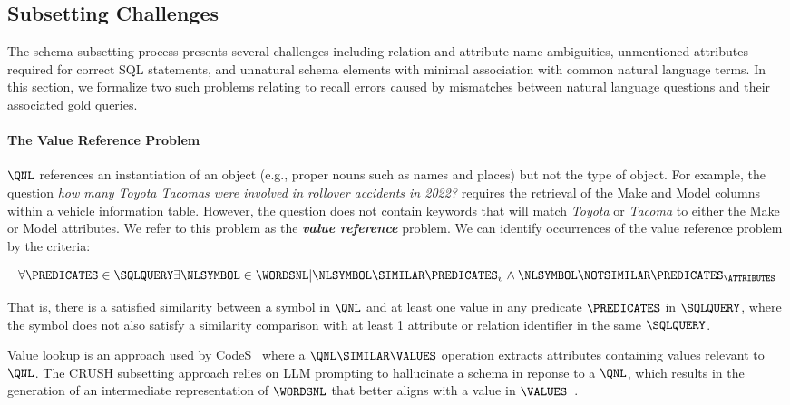 \subsection{Subsetting Challenges}
\label{sec:subsetting-challenges}

The schema subsetting process presents several challenges including relation and attribute name ambiguities, unmentioned attributes required for correct SQL statements, and unnatural schema elements with minimal association with common natural language terms.
In this section, we formalize two such problems relating to recall errors caused by mismatches between natural language questions and their associated gold queries.

\paragraph{\textbf{The Value Reference Problem}}
$\QNL$ references an instantiation of an object (e.g., proper nouns such as names and places) but not the type of object.
For example, the question \emph{how many Toyota Tacomas were involved in rollover accidents in 2022?} requires the retrieval of the Make and Model columns within a vehicle information table.
However, the question does not contain keywords that will match \emph{Toyota} or \emph{Tacoma} to either the Make or Model attributes.
We refer to this problem as the \textbf{\emph{value reference}} problem.
We can identify occurrences of the value reference problem by the criteria:

\begin{equation}
  \forall \PREDICATES \in \SQLQUERY \exists \NLSYMBOL \in \WORDSNL | \NLSYMBOL \SIMILAR \PREDICATES_v \land \NLSYMBOL \NOTSIMILAR \PREDICATES_\ATTRIBUTES
\end{equation}

That is, there is a satisfied similarity between a symbol in $\QNL$ and at least one value in any predicate $\PREDICATES$ in $\SQLQUERY$, where the symbol does not also satisfy a similarity comparison with at least 1 attribute or relation identifier in the same $\SQLQUERY$.

Value lookup is an approach used by CodeS~\cite{li2024codes} where a $\QNL \SIMILAR \VALUES$ operation extracts attributes containing values relevant to $\QNL$.
The CRUSH subsetting approach relies on LLM prompting to hallucinate a schema in reponse to a $\QNL$, which results in the generation of an intermediate representation of $\WORDSNL$ that better aligns with a value in $\VALUES$~\cite{kothyari-etal-2023-crush4sql}.

